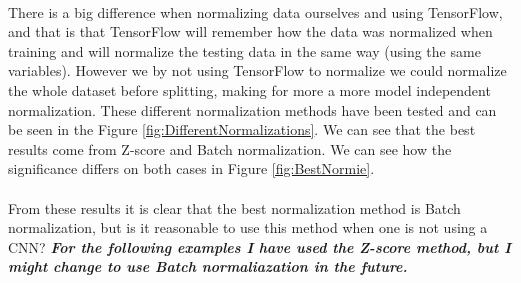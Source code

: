 \documentclass[14pt, a4paper]{book}
\begin{document}
\\There is a big difference when normalizing data ourselves and using TensorFlow, and that is that TensorFlow will remember how the data was normalized when training and will normalize the testing data in the same way (using the same variables). However we by not using TensorFlow to normalize we could normalize the whole dataset before splitting, making for more a more model independent normalization. 
These different normalization methods have been tested and can be seen in the Figure \ref{fig:DifferentNormalizations}. 
We can see that the best results come from Z-score and Batch normalization. We can see how the significance differs on both cases in Figure \ref{fig:BestNormie}.\\
\\From these results it is clear that the best normalization method is Batch normalization, but is it reasonable to use this method when one is not using a CNN? \textit{\textbf{For the following examples I have used the Z-score method, but I might change to use Batch normaliazation in the future.}}
\graphicspath{{../../../Plots/TESTING/NeuralNetwork/NORMALIZATIONS/}}
\end{document}
